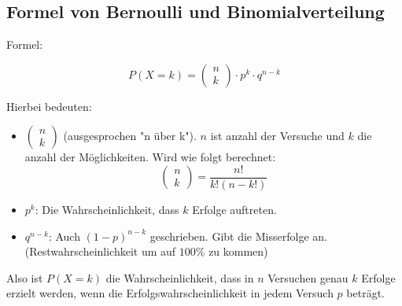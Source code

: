 \subsection{Formel von Bernoulli und Binomialverteilung}
\label{sec:bernoulli}
Formel: 

\[
    P(X = k) = 
    \begin{pmatrix}
        n \\ k
    \end{pmatrix}
    \cdot p^k \cdot q^{n-k}
\]

Hierbei bedeuten:
\begin{itemize}
    \item $
    \begin{pmatrix}
        n \\ k
    \end{pmatrix}
    $
    (ausgesprochen "n über k"). 
    $n$ ist anzahl der Versuche und $k$ die anzahl der Möglichkeiten. Wird wie folgt berechnet: 
    \[
        \begin{pmatrix}
            n \\ k
        \end{pmatrix}
        =
        \frac{n!}{k!(n-k!)}
    \]

    \item $p^k$: Die Wahrscheinlichkeit, dass $k$ Erfolge auftreten.
    \item $q^{n-k}$: Auch $(1-p)^{n-k}$ geschrieben. Gibt die Misserfolge an. (Restwahrscheinlichkeit um auf $100\%$ zu kommen)
\end{itemize}

Also ist $P(X=k)$ die Wahrscheinlichkeit, dass in $n$ Versuchen genau $k$ Erfolge erzielt werden, wenn die Erfolgswahrscheinlichkeit in jedem Versuch $p$ beträgt.
